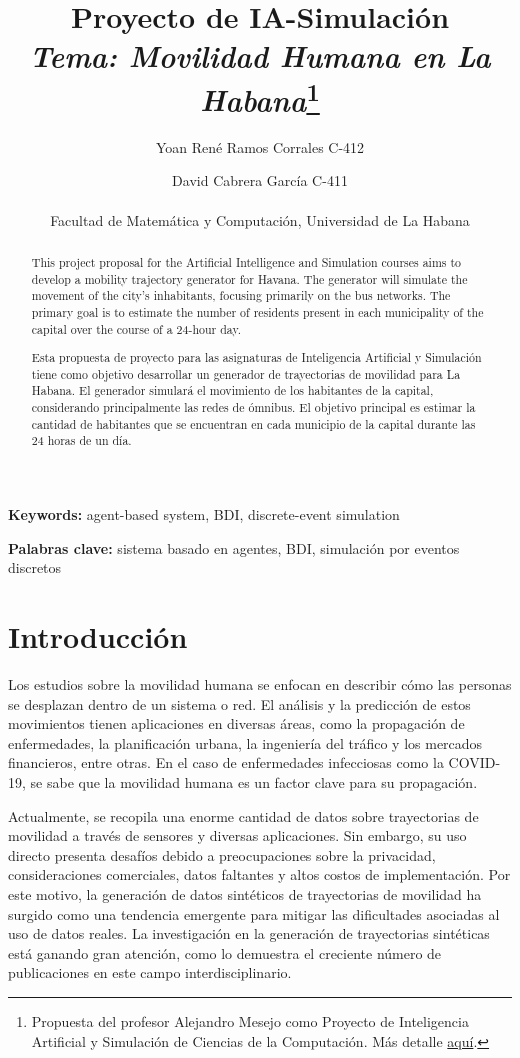 \documentclass[a4paper,12pt]{article}
\title{Proyecto de IA-Simulaci\'on\\\textit{Tema: Movilidad Humana en La Habana}\footnote{Propuesta del profesor Alejandro Mesejo como Proyecto de Inteligencia Artificial y Simulaci\'on de Ciencias de la Computación. M\'as detalle \href{https://github.com/YoanRene/AI-Sim/blob/master/docs/PropuestaProyecto-Simulacion-IA.pdf}{aqu\'i}.}}
\author{Yoan Ren\'e Ramos Corrales  C-412  \and  David Cabrera Garc\'ia  C-411 \\\\ \small{Facultad de Matemática y Computación, Universidad de La Habana}}
\begin{document}
\maketitle

\renewcommand{\abstractname}{Abstract}
\begin{abstract}
This project proposal for the Artificial Intelligence and Simulation courses aims to develop a mobility trajectory generator for Havana. The generator will simulate the movement of the city's inhabitants, focusing primarily on the bus networks. The primary goal is to estimate the number of residents present in each municipality of the capital over the course of a 24-hour day.

\end{abstract}
\textbf{Keywords:} agent-based system, BDI, discrete-event simulation
\renewcommand{\abstractname}{Resumen}
\begin{abstract}
Esta propuesta de proyecto para las asignaturas de Inteligencia Artificial y Simulación tiene como objetivo desarrollar un generador de trayectorias de movilidad para La Habana. El generador simulará el movimiento de los habitantes de la capital, considerando principalmente las redes de ómnibus. El objetivo principal es estimar la cantidad de habitantes que se encuentran en cada municipio de la capital durante las 24 horas de un día.
\end{abstract}
\textbf{Palabras clave:} sistema basado en agentes, BDI, simulación por eventos discretos

\newpage
\tableofcontents
\newpage
\section{Introducción}
Los estudios sobre la movilidad humana se enfocan en describir cómo las personas se desplazan dentro de un sistema o red. El análisis y la predicción de estos movimientos tienen aplicaciones en diversas áreas, como la propagación de enfermedades, la planificación urbana, la ingeniería del tráfico y los mercados financieros, entre otras. En el caso de enfermedades infecciosas como la COVID-19, se sabe que la movilidad humana es un factor clave para su propagación.

Actualmente, se recopila una enorme cantidad de datos sobre trayectorias de movilidad a través de sensores y diversas aplicaciones. Sin embargo, su uso directo presenta desafíos debido a preocupaciones sobre la privacidad, consideraciones comerciales, datos faltantes y altos costos de implementación. Por este motivo, la generación de datos sintéticos de trayectorias de movilidad ha surgido como una tendencia emergente para mitigar las dificultades asociadas al uso de datos reales. La investigación en la generación de trayectorias sintéticas está ganando gran atención, como lo demuestra el creciente número de publicaciones en este campo interdisciplinario.
\end{document}
